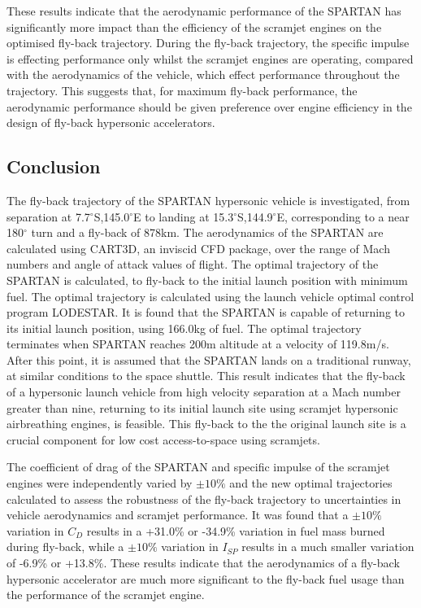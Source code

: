 These results indicate that the aerodynamic performance of the SPARTAN has significantly more impact than the efficiency of the scramjet engines on the optimised fly-back trajectory. During the fly-back trajectory, the specific impulse is effecting performance only whilst the scramjet engines are operating, compared with the aerodynamics of the vehicle, which effect performance throughout the trajectory. This suggests that, for maximum fly-back performance, the aerodynamic performance should be given preference over engine efficiency in the design of fly-back hypersonic accelerators. 





\subsection{Conclusion}
The fly-back trajectory of the SPARTAN hypersonic vehicle is investigated, from separation at 7.7$^\circ$S,145.0$^\circ$E to landing at 15.3$^\circ$S,144.9$^\circ$E, corresponding to a near 180$^\circ$ turn and a fly-back of 878km. The aerodynamics of the SPARTAN are calculated using CART3D, an inviscid CFD package, over the range of Mach numbers and angle of attack values of flight. The optimal trajectory of the SPARTAN is calculated, to fly-back to the initial launch position with minimum fuel. The optimal trajectory is calculated using the launch vehicle optimal control program LODESTAR. It is found that the SPARTAN is capable of returning to its initial launch position, using 166.0kg of fuel. The optimal trajectory terminates when SPARTAN reaches 200m altitude at a velocity of 119.8m/s. After this point, it is assumed that the SPARTAN lands on a traditional runway, at similar conditions to the space shuttle.  
This result indicates that the fly-back of a hypersonic launch vehicle from high velocity separation at a Mach number greater than nine, returning to its initial launch site using scramjet hypersonic airbreathing engines, is feasible. This fly-back to the the original launch site is a crucial component for low cost access-to-space using scramjets. 

The coefficient of drag of the SPARTAN and specific impulse of the scramjet engines were independently varied by $\pm10\%$ and the new optimal trajectories calculated to assess the robustness of the fly-back trajectory to uncertainties in vehicle aerodynamics and scramjet performance. It was found that a $\pm10\%$ variation in $C_D$ results in a +31.0\% or -34.9\% variation in fuel mass burned during fly-back, while a $\pm10\%$ variation in $I_{SP}$ results in a much smaller variation of -6.9\% or +13.8\%. These results indicate that the aerodynamics of a fly-back hypersonic accelerator are much more significant to the fly-back fuel usage than the performance of the scramjet engine. 

